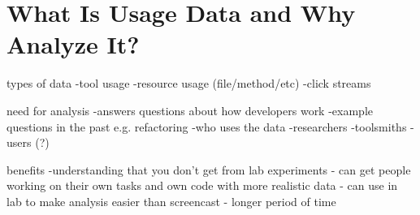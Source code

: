 \section{What Is Usage Data and Why Analyze It?}

types of data
	-tool usage
	-resource usage (file/method/etc)
	-click streams

need for analysis
	-answers questions about how developers work
	-example questions in the past e.g. refactoring
	-who uses the data
		-researchers
		-toolsmiths
		-users (?)

benefits
	-understanding that you don't get from lab experiments
		- can get people working on their own tasks and own code with more realistic data
		- can use in lab to make analysis easier than screencast
		- longer period of time